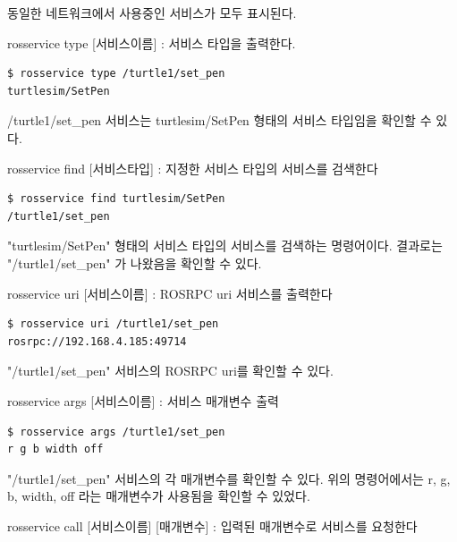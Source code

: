 \noindent
동일한 네트워크에서 사용중인 서비스가 모두 표시된다.

\vspace{\baselineskip}
\noindent
{}\circled{\thenum} rosservice type [서비스이름] : 서비스 타입을 출력한다.

\begin{lstlisting}[language=ROS]
$ rosservice type /turtle1/set_pen
turtlesim/SetPen
\end{lstlisting}

\noindent
/turtle1/set\_pen 서비스는 turtlesim/SetPen 형태의 서비스 타입임을 확인할 수 있다.

\vspace{\baselineskip}
\noindent
{}\circled{\thenum} rosservice find [서비스타입] : 지정한 서비스 타입의 서비스를 검색한다

\begin{lstlisting}[language=ROS]
$ rosservice find turtlesim/SetPen
/turtle1/set_pen
\end{lstlisting}

\noindent
"turtlesim/SetPen" 형태의 서비스 타입의 서비스를 검색하는 명령어이다. 결과로는 "/turtle1/set\_pen" 가 나왔음을 확인할 수 있다.

\vspace{\baselineskip}
\noindent
{}\circled{\thenum} rosservice uri [서비스이름] : ROSRPC uri 서비스를 출력한다

\begin{lstlisting}[language=ROS]
$ rosservice uri /turtle1/set_pen
rosrpc://192.168.4.185:49714
\end{lstlisting}

\noindent
"/turtle1/set\_pen" 서비스의 ROSRPC uri를 확인할 수 있다.

\vspace{\baselineskip}
\noindent
{}\circled{\thenum} rosservice args [서비스이름] : 서비스 매개변수 출력

\begin{lstlisting}[language=ROS]
$ rosservice args /turtle1/set_pen
r g b width off
\end{lstlisting}

\noindent
"/turtle1/set\_pen" 서비스의 각 매개변수를 확인할 수 있다. 위의 명령어에서는 r, g, b, width, off 라는 매개변수가 사용됨을 확인할 수 있었다.

\vspace{\baselineskip}
\noindent
{}\circled{\thenum}  rosservice call [서비스이름] [매개변수] : 입력된 매개변수로 서비스를 요청한다

